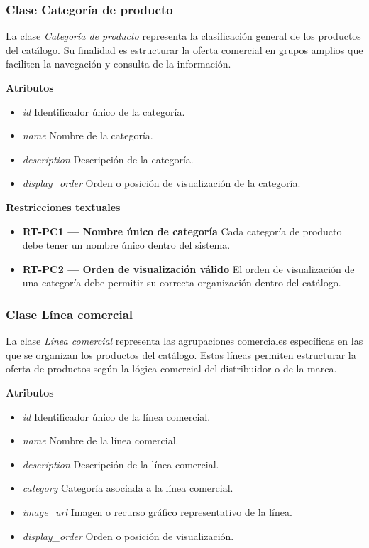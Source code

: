 \subsubsection{Clase Categoría de producto}

La clase \textit{Categoría de producto} representa la clasificación general de los productos del catálogo. Su finalidad es estructurar la oferta comercial en grupos amplios que faciliten la navegación y consulta de la información.

\textbf{Atributos}

\begin{itemize}
      \item \textit{id}
            Identificador único de la categoría.
      \item \textit{name}
            Nombre de la categoría.
      \item \textit{description}
            Descripción de la categoría.
      \item \textit{display\_order}
            Orden o posición de visualización de la categoría.
\end{itemize}

\textbf{Restricciones textuales}

\begin{itemize}
      \item \textbf{RT-PC1 — Nombre único de categoría}
            Cada categoría de producto debe tener un nombre único dentro del sistema.
      \item \textbf{RT-PC2 — Orden de visualización válido}
            El orden de visualización de una categoría debe permitir su correcta organización dentro del catálogo.
\end{itemize}

\subsubsection{Clase Línea comercial}

La clase \textit{Línea comercial} representa las agrupaciones comerciales específicas en las que se organizan los productos del catálogo. Estas líneas permiten estructurar la oferta de productos según la lógica comercial del distribuidor o de la marca.

\textbf{Atributos}

\begin{itemize}
      \item \textit{id}
            Identificador único de la línea comercial.
      \item \textit{name}
            Nombre de la línea comercial.
      \item \textit{description}
            Descripción de la línea comercial.
      \item \textit{category}
            Categoría asociada a la línea comercial.
      \item \textit{image\_url}
            Imagen o recurso gráfico representativo de la línea.
      \item \textit{display\_order}
            Orden o posición de visualización.
\end{itemize}

